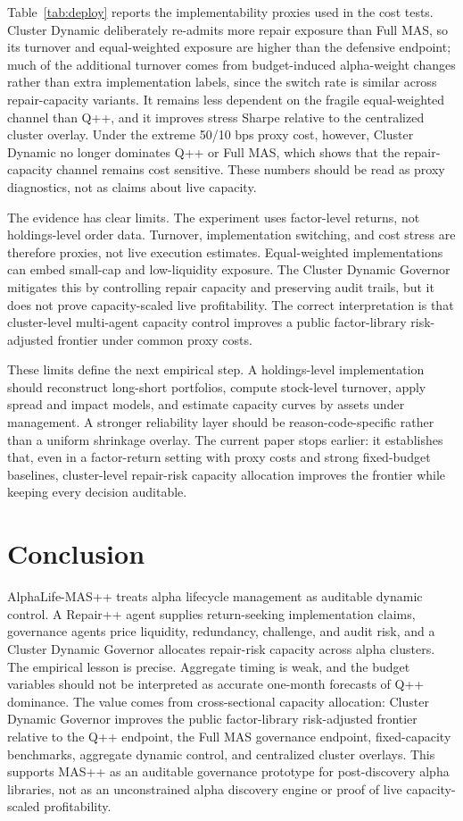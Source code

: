 \documentclass[sigconf,nonacm]{acmart}
\begin{document}
Table~\ref{tab:deploy} reports the implementability proxies used in the cost tests. Cluster Dynamic deliberately re-admits more repair exposure than Full MAS, so its turnover and equal-weighted exposure are higher than the defensive endpoint; much of the additional turnover comes from budget-induced alpha-weight changes rather than extra implementation labels, since the switch rate is similar across repair-capacity variants. It remains less dependent on the fragile equal-weighted channel than Q++, and it improves stress Sharpe relative to the centralized cluster overlay. Under the extreme 50/10 bps proxy cost, however, Cluster Dynamic no longer dominates Q++ or Full MAS, which shows that the repair-capacity channel remains cost sensitive. These numbers should be read as proxy diagnostics, not as claims about live capacity.

The evidence has clear limits. The experiment uses factor-level returns, not holdings-level order data. Turnover, implementation switching, and cost stress are therefore proxies, not live execution estimates. Equal-weighted implementations can embed small-cap and low-liquidity exposure. The Cluster Dynamic Governor mitigates this by controlling repair capacity and preserving audit trails, but it does not prove capacity-scaled live profitability. The correct interpretation is that cluster-level multi-agent capacity control improves a public factor-library risk-adjusted frontier under common proxy costs.

These limits define the next empirical step. A holdings-level implementation should reconstruct long-short portfolios, compute stock-level turnover, apply spread and impact models, and estimate capacity curves by assets under management. A stronger reliability layer should be reason-code-specific rather than a uniform shrinkage overlay. The current paper stops earlier: it establishes that, even in a factor-return setting with proxy costs and strong fixed-budget baselines, cluster-level repair-risk capacity allocation improves the frontier while keeping every decision auditable.

\section{Conclusion}

AlphaLife-MAS++ treats alpha lifecycle management as auditable dynamic control. A Repair++ agent supplies return-seeking implementation claims, governance agents price liquidity, redundancy, challenge, and audit risk, and a Cluster Dynamic Governor allocates repair-risk capacity across alpha clusters. The empirical lesson is precise. Aggregate timing is weak, and the budget variables should not be interpreted as accurate one-month forecasts of Q++ dominance. The value comes from cross-sectional capacity allocation: Cluster Dynamic Governor improves the public factor-library risk-adjusted frontier relative to the Q++ endpoint, the Full MAS governance endpoint, fixed-capacity benchmarks, aggregate dynamic control, and centralized cluster overlays. This supports MAS++ as an auditable governance prototype for post-discovery alpha libraries, not as an unconstrained alpha discovery engine or proof of live capacity-scaled profitability.



\end{document}

